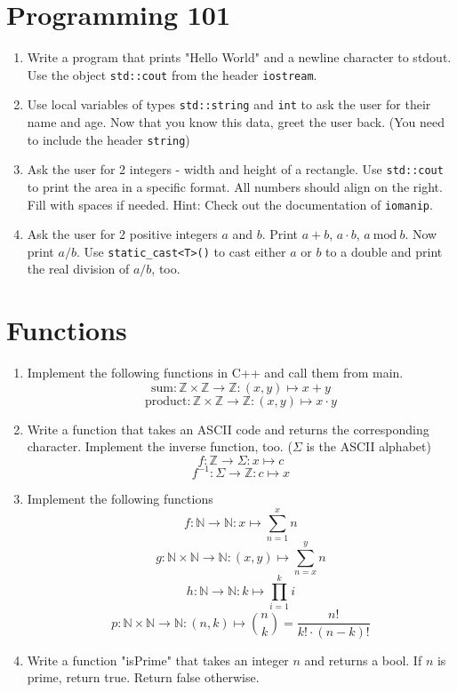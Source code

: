 \documentclass[12pt, a4paper]{article}
\begin{document}
\section*{Programming 101}
\begin{enumerate}
    \item Write a program that prints "Hello World" and a newline character to stdout. Use the object \lstinline{std::cout} from the header \lstinline{iostream}.
    \item Use local variables of types \lstinline{std::string} and \lstinline{int} to ask the user for their name and age. Now that you know this data, greet the user back. (You need to include the header \lstinline{string})
    \item Ask the user for 2 integers - width and height of a rectangle. Use \lstinline{std::cout} to print the area in a specific format. All numbers should align on the right. Fill with spaces if needed. Hint: Check out the documentation of \lstinline{iomanip}.
    \item Ask the user for 2 positive integers $a$ and $b$. Print $a + b$, $a \cdot b$, $a \ \textrm{mod} \ b$. Now print $a / b$. Use \lstinline{static_cast<T>()} to cast either $a$ or $b$ to a double and print the real division of $a / b$, too.
\end{enumerate}
\section*{Functions}
\begin{enumerate}
    \item Implement the following functions in C++ and call them from main.
    $$ \textrm{sum}: \mathbb{Z} \times \mathbb{Z} \to \mathbb{Z}: (x,y) \mapsto x + y $$
    $$ \textrm{product}: \mathbb{Z} \times \mathbb{Z} \to \mathbb{Z}: (x,y) \mapsto x \cdot y $$
    \item Write a function that takes an ASCII code and returns the corresponding character. Implement the inverse function, too. ($\Sigma$ is the ASCII alphabet)
    $$ f: \mathbb{Z} \to \Sigma: x \mapsto c $$
    $$ f^{-1}: \Sigma \to \mathbb{Z}: c \mapsto x $$
    \item Implement the following functions
    $$f: \mathbb{N} \to \mathbb{N}: x \mapsto \sum_{n=1}^{x} n$$
    $$g: \mathbb{N} \times \mathbb{N} \to \mathbb{N}: (x,y) \mapsto \sum_{n=x}^{y} n $$
    $$h: \mathbb{N} \to \mathbb{N}: k \mapsto \prod_{i=1}^{k} i$$
    $$p: \mathbb{N} \times \mathbb{N} \to \mathbb{N}: (n, k) \mapsto \binom{n}{k} = \frac{n!}{k! \cdot (n-k)!}$$
    \item Write a function "isPrime" that takes an integer $n$ and returns a bool. If $n$ is prime, return true. Return false otherwise.

\end{enumerate}
\end{document}
